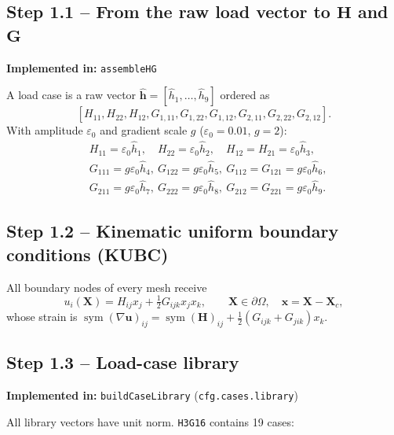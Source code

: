 \documentclass[11pt,a4paper]{article}
\newcommand{\bx}{\bm{x}}
\newcommand{\bX}{\bm{X}}
\newcommand{\bu}{\bm{u}}
\newcommand{\bH}{\bm{H}}
\newcommand{\bG}{\bm{G}}
\newcommand{\sym}{\operatorname{sym}}
\newcommand{\code}[1]{\texttt{#1}}
\theoremstyle{plain}
\theoremstyle{remark}
\newcommand{\implementedin}[1]{\begin{codebox}\textbf{Implemented in:} #1\end{codebox}}
\begin{document}
\subsection*{Step 1.1 -- From the raw load vector to $\bH$ and $\bG$}
\implementedin{\code{assembleHG}}
A load case is a raw vector $\hat{\bm h}=[\hat h_1,\dots,\hat h_9]$ ordered as
\[
  [H_{11},H_{22},H_{12},G_{1,11},G_{1,22},G_{1,12},G_{2,11},G_{2,22},G_{2,12}] .
\]
With amplitude $\varepsilon_0$ and gradient scale $g$ ($\varepsilon_0=0.01$, $g=2$):
\begin{equation}
\begin{aligned}
  &H_{11}=\varepsilon_0\hat h_1,\quad H_{22}=\varepsilon_0\hat h_2,\quad H_{12}=H_{21}=\varepsilon_0\hat h_3,\\
  &G_{111}=g\varepsilon_0\hat h_4,\ G_{122}=g\varepsilon_0\hat h_5,\ G_{112}=G_{121}=g\varepsilon_0\hat h_6,\\
  &G_{211}=g\varepsilon_0\hat h_7,\ G_{222}=g\varepsilon_0\hat h_8,\ G_{212}=G_{221}=g\varepsilon_0\hat h_9 .
\end{aligned}
\label{eq:HG}
\end{equation}

\subsection*{Step 1.2 -- Kinematic uniform boundary conditions (KUBC)}
All boundary nodes of every mesh receive
\begin{equation}
  u_i(\bX)=H_{ij}x_j+\tfrac12 G_{ijk}x_jx_k,\qquad \bX\in\partial\Omega,\quad \bx=\bX-\bX_c,
  \label{eq:kubc}
\end{equation}
whose strain is $\sym(\nabla\bu)_{ij}=\sym(\bH)_{ij}+\tfrac12(G_{ijk}+G_{jik})x_k$.

\subsection*{Step 1.3 -- Load-case library}
\implementedin{\code{buildCaseLibrary} (\code{cfg.cases.library})}
All library vectors have unit norm. \code{H3G16} contains 19 cases:
\end{document}
